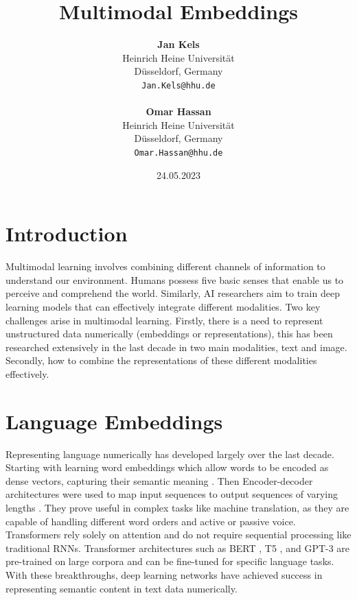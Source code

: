 \documentclass[11pt,a4paper]{article}
\title{Multimodal Embeddings}
\author{
  \textbf{Jan Kels} \\
  Heinrich Heine Universität \\
  Düsseldorf, Germany \\
  \texttt{Jan.Kels@hhu.de} \\ \\\And
  \textbf{Omar Hassan}\\
  Heinrich Heine Universität \\
  Düsseldorf, Germany \\
  \texttt{Omar.Hassan@hhu.de}
  }
\date{24.05.2023}  %
\begin{document}
\maketitle


\section{Introduction} %
Multimodal learning involves combining different channels of information to understand our environment. Humans possess five basic senses that enable us to perceive and comprehend the world. Similarly, AI researchers aim to train deep learning models that can effectively integrate different modalities. Two key challenges arise in multimodal learning. Firstly, there is a need to represent unstructured data numerically (embeddings or representations), this has been researched extensively in the last decade in two main modalities, text and image. Secondly, how to combine the representations of these different modalities effectively. \cite{akkus2023multimodal}

\section{Language Embeddings}
Representing language numerically has developed largely over the last decade. Starting with learning word embeddings which allow words to be encoded as dense vectors, capturing their semantic meaning \cite{mikolov2013efficient}. Then Encoder-decoder architectures were used to map input sequences to output sequences of varying lengths \cite{bahdanau2016neural}. They prove useful in complex tasks like machine translation, as they are capable of handling different word orders and active or passive voice.
Transformers \cite{vaswani2017attention} rely solely on attention and do not require sequential processing like traditional RNNs. Transformer architectures such as BERT \cite{devlin2019bert}, T5 \cite{raffel2020exploring}, and GPT-3 \cite{brown2020language} are pre-trained on large corpora and can be fine-tuned for specific language tasks. With these breakthroughs, deep learning networks have achieved success in representing semantic content in text data numerically.
\end{document}

